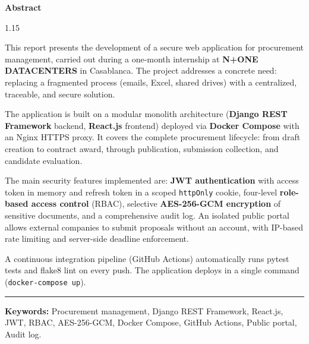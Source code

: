 \newpage

\hskip7mm
\vspace{3cm}
\begin{center}
{\textbf{\Huge Abstract}}
\end{center}
\vspace{1cm}

\begin{spacing}{1.15}
{\large
This report presents the development of a secure web application for procurement
management, carried out during a one-month internship at \textbf{N+ONE DATACENTERS}
in Casablanca. The project addresses a concrete need: replacing a fragmented process
(emails, Excel, shared drives) with a centralized, traceable, and secure solution.

\vspace{0.4cm}

The application is built on a modular monolith architecture (\textbf{Django REST Framework}
backend, \textbf{React.js} frontend) deployed via \textbf{Docker Compose} with an Nginx
HTTPS proxy. It covers the complete procurement lifecycle: from draft creation to contract
award, through publication, submission collection, and candidate evaluation.

\vspace{0.4cm}

The main security features implemented are: \textbf{JWT authentication} with access token
in memory and refresh token in a scoped \texttt{httpOnly} cookie, four-level
\textbf{role-based access control} (RBAC), selective \textbf{AES-256-GCM encryption}
of sensitive documents, and a comprehensive audit log. An isolated public portal allows
external companies to submit proposals without an account, with IP-based rate limiting
and server-side deadline enforcement.

\vspace{0.4cm}

A continuous integration pipeline (GitHub Actions) automatically runs pytest tests and
flake8 lint on every push. The application deploys in a single command
(\texttt{docker-compose up}).

\vspace{0.8cm}

\noindent\rule{\linewidth}{0.4pt}
\vspace{0.3cm}

\noindent\textbf{Keywords:} Procurement management, Django REST Framework, React.js,
JWT, RBAC, AES-256-GCM, Docker Compose, GitHub Actions, Public portal, Audit log.
}
\end{spacing}

